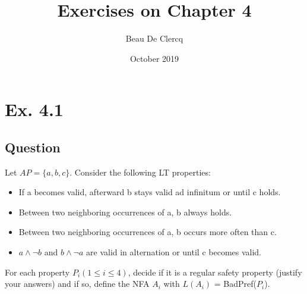 \documentclass[12pt]{article}
\title{Exercises on Chapter 4}
\author{Beau De Clercq}
\date{October 2019}
\begin{document}
\maketitle{}


\clearpage
\newpage

\section*{Ex. 4.1}
\subsection*{Question}
Let $AP = \{ a, b, c \}$. Consider the following LT properties:
\begin{itemize}
	\item If a becomes valid, afterward b stays valid ad infinitum or until c holds.
	\item Between two neighboring occurrences of a, b always holds.
	\item Between two neighboring occurrences of a, b occurs more often than c.
	\item $a\wedge \neg b$ and $b \wedge \neg a$ are valid in alternation or until c becomes valid.
\end{itemize}
For each property $P_i (1\leq i\leq 4)$, decide if it is a regular safety property (justify your answers) and
if so, define the NFA $A_i$ with $L(A_i)$ = BadPref($P_i$).
\end{document}

